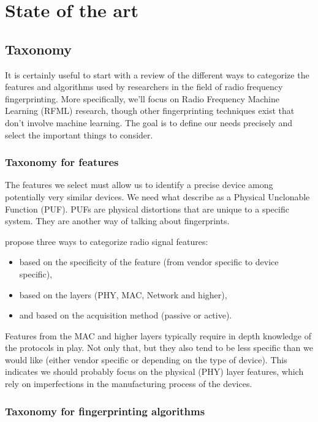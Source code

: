 \section{State of the art}

\subsection{Taxonomy}

It is certainly useful to start with a review of the different ways to categorize the features and algorithms used by researchers in the field of radio frequency fingerprinting. More specifically, we'll focus on Radio Frequency Machine Learning (RFML) research, though other fingerprinting techniques exist that don't involve machine learning. The goal is to define our needs precisely and select the important things to consider.

\subsubsection{Taxonomy for features} \label{features_tax}

The features we select must allow us to identify a precise device among potentially very similar devices. We need what \textcite{delgado_passive_2020} describe as a Physical Unclonable Function (PUF). PUFs are physical distortions that are unique to a specific system. They are another way of talking about fingerprints.

\textcite{xu_device_2015} propose three ways to categorize radio signal features:

\begin{itemize}
  \item based on the specificity of the feature (from vendor specific to device specific),
  \item based on the layers (PHY, MAC, Network and higher),
  \item and based on the acquisition method (passive or active).
\end{itemize}

Features from the MAC and higher layers typically require in depth knowledge of the protocols in play. Not only that, but they also tend to be less specific than we would like (either vendor specific or depending on the type of device). This indicates we should probably focus on the physical (PHY) layer features, which rely on imperfections in the manufacturing process of the devices.

\subsubsection{Taxonomy for fingerprinting algorithms} \label{algo-taxo}

